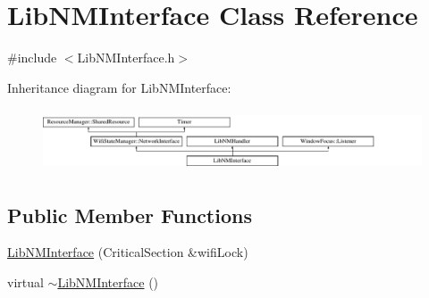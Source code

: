 \hypertarget{classLibNMInterface}{}\section{Lib\+N\+M\+Interface Class Reference}
\label{classLibNMInterface}


{\ttfamily \#include $<$Lib\+N\+M\+Interface.\+h$>$}

Inheritance diagram for Lib\+N\+M\+Interface\+:\begin{figure}[H]
\begin{center}
\leavevmode
\includegraphics[height=1.858407cm]{classLibNMInterface}
\end{center}
\end{figure}
\subsection*{Public Member Functions}
\begin{DoxyCompactItemize}
\item 
\mbox{\hyperlink{classLibNMInterface_a4dc08d1cab2e2984976c69152ce2a92b}{Lib\+N\+M\+Interface}} (Critical\+Section \&wifi\+Lock)
\item 
virtual \mbox{\hyperlink{classLibNMInterface_a0e0b81b6b5b14fbfc5633576d554fb64}{$\sim$\+Lib\+N\+M\+Interface}} ()
\end{DoxyCompactItemize}
